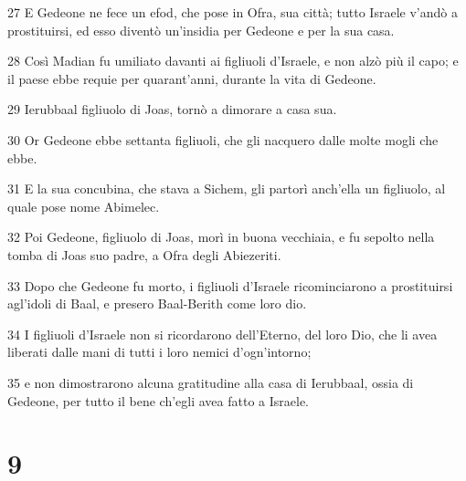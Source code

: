 \par 27 E Gedeone ne fece un efod, che pose in Ofra, sua città; tutto Israele v'andò a prostituirsi, ed esso diventò un'insidia per Gedeone e per la sua casa.
\par 28 Così Madian fu umiliato davanti ai figliuoli d'Israele, e non alzò più il capo; e il paese ebbe requie per quarant'anni, durante la vita di Gedeone.
\par 29 Ierubbaal figliuolo di Joas, tornò a dimorare a casa sua.
\par 30 Or Gedeone ebbe settanta figliuoli, che gli nacquero dalle molte mogli che ebbe.
\par 31 E la sua concubina, che stava a Sichem, gli partorì anch'ella un figliuolo, al quale pose nome Abimelec.
\par 32 Poi Gedeone, figliuolo di Joas, morì in buona vecchiaia, e fu sepolto nella tomba di Joas suo padre, a Ofra degli Abiezeriti.
\par 33 Dopo che Gedeone fu morto, i figliuoli d'Israele ricominciarono a prostituirsi agl'idoli di Baal, e presero Baal-Berith come loro dio.
\par 34 I figliuoli d'Israele non si ricordarono dell'Eterno, del loro Dio, che li avea liberati dalle mani di tutti i loro nemici d'ogn'intorno;
\par 35 e non dimostrarono alcuna gratitudine alla casa di Ierubbaal, ossia di Gedeone, per tutto il bene ch'egli avea fatto a Israele.

\chapter{9}


